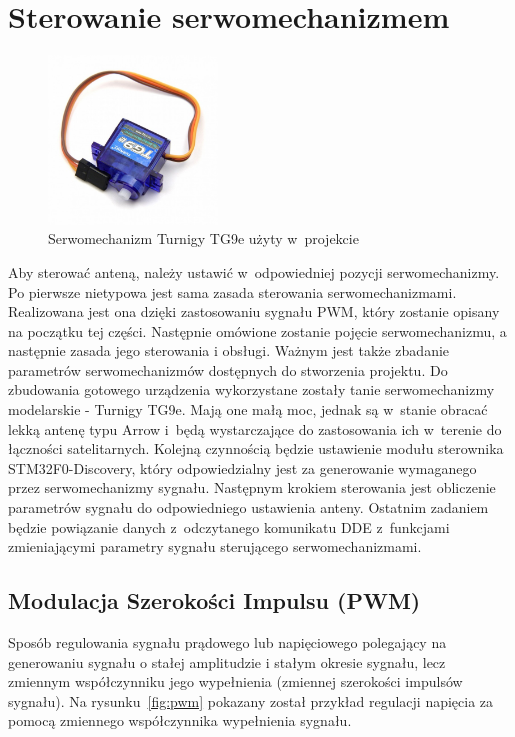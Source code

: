 \documentclass[eng,oneside]{mgr}
\begin{document}
		\section{Sterowanie serwomechanizmem}
		\label{sec:servo_steering}
			\begin{figure}
				\vspace{-20pt}
				\begin{center}
					\includegraphics[width=0.4\textwidth]{servo}
				\end{center}
				\vspace{-20pt}
				\caption{Serwomechanizm Turnigy TG9e użyty w~projekcie}
				\vspace{-10pt}
				\label{fig:servo}
			\end{figure}
		Aby sterować anteną, należy ustawić w~odpowiedniej pozycji serwomechanizmy. Po pierwsze nietypowa jest sama zasada sterowania serwomechanizmami. Realizowana jest ona dzięki zastosowaniu sygnału PWM, który zostanie opisany na początku tej części. Następnie omówione zostanie pojęcie serwomechanizmu, a następnie zasada jego sterowania i obsługi. Ważnym jest także zbadanie parametrów serwomechanizmów dostępnych do stworzenia projektu. Do zbudowania gotowego urządzenia wykorzystane zostały tanie serwomechanizmy modelarskie - Turnigy TG9e. Mają one małą moc, jednak są w~stanie obracać lekką antenę typu Arrow i~będą wystarczające do zastosowania ich w~terenie do łączności satelitarnych. Kolejną czynnością będzie ustawienie modułu sterownika STM32F0-Discovery, który odpowiedzialny jest za generowanie wymaganego przez serwomechanizmy sygnału. Następnym krokiem sterowania jest obliczenie parametrów sygnału do odpowiedniego ustawienia anteny. Ostatnim zadaniem będzie powiązanie danych z~odczytanego komunikatu DDE z~funkcjami zmieniającymi parametry sygnału sterującego serwomechanizmami.

			\subsection{Modulacja Szerokości Impulsu (PWM)}
			Sposób regulowania sygnału prądowego lub napięciowego polegający na generowaniu sygnału o stałej amplitudzie i stałym okresie sygnału, lecz zmiennym współczynniku jego wypełnienia (zmiennej szerokości impulsów sygnału). Na rysunku~\ref{fig:pwm} pokazany został przykład regulacji napięcia za pomocą zmiennego współczynnika wypełnienia sygnału. 
\end{document}
